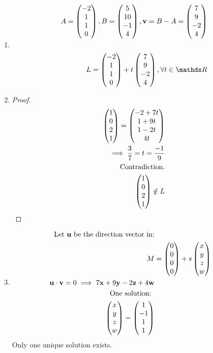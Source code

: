 \begin{solution}
    \begin{enumerate}
        \item
            \begin{align*}
                A = \vvvv{-2}{1}{1}{0},
                B = \vvvv{5}{10}{-1}{4},
                \bv = B - A = \vvvv{7}{9}{-2}{4}
                \\\\
                L = \vvvv{-2}{1}{1}{0}
                  + t\vvvv{7}{9}{-2}{4},
                  \forall t \in \bbR
            \end{align*}
        \item
            \begin{proof}\begin{align*}
                \begin{pmatrix} 1 \\ 0 \\ 2 \\ 1 \end{pmatrix} = \begin{pmatrix} -2 + 7t \\ 1 + 9t \\ 1 - 2t \\ 4t \end{pmatrix}
                \\
                \implies \frac{3}{7} = t = \frac{-1}{9}
                \\
                \text{Contradiction.}
                \\
                \begin{pmatrix} 1 \\ 0 \\ 2 \\ 1 \end{pmatrix} \notin L
            \end{align*}\end{proof}
        \item
            \begin{align*}
                \text{Let $\mathbf{u}$ be the direction vector in:}\\
                M &= \begin{pmatrix} 0 \\ 0 \\ 0 \\ 0 \end{pmatrix} + s\begin{pmatrix} x \\ y \\ z \\ w \end{pmatrix}
                \\
                \mathbf{u} \cdot \mathbf{v} = 0 \implies 7\mathbf{x} + 9\mathbf{y} -2\mathbf{z} + 4\mathbf{w}
                \\
                \text{One solution: }
                \\
                \begin{pmatrix} x \\ y \\ z \\ w \end{pmatrix} = \begin{pmatrix} 1 \\ -1 \\ 1 \\ 1 \end{pmatrix}
            \end{align*}
            Only one unique solution exists.
    \end{enumerate}
\end{solution}
